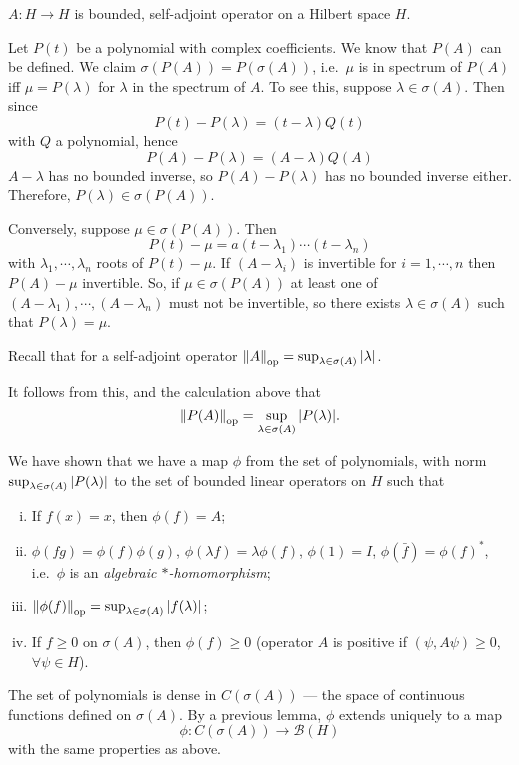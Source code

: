 \documentclass[a4paper,11pt]{article}
\begin{document}
	$A : H \to H$ is bounded, self-adjoint operator on a Hilbert space $H$.

	Let $P(t)$ be a polynomial with complex coefficients. We know that $P(A)$ can be defined. We claim $\sigma(P(A)) = P(\sigma(A))$, i.e.\ $\mu$ is in spectrum of $P(A)$ iff $\mu = P(\lambda)$ for $\lambda$ in the spectrum of $A$. To see this, suppose $\lambda \in \sigma(A)$. Then since 
	\[
		P(t) - P(\lambda) = (t - \lambda) Q(t)
	\]
	with $Q$ a polynomial, hence 
	\[
		P(A) - P(\lambda) = (A - \lambda) Q(A)
	\]
	$A - \lambda$ has no bounded inverse, so $P(A) - P(\lambda)$ has no bounded inverse either. Therefore, $P(\lambda) \in \sigma(P(A))$.
	
	Conversely, suppose $\mu \in \sigma(P(A))$. Then 
	\[
		P(t) - \mu = a(t - \lambda_1) \cdots (t - \lambda_n)
	\]
	with $\lambda_1, \cdots, \lambda_n$ roots of $P(t) - \mu$. If $(A - \lambda_i)$ is invertible for $i = 1,\cdots, n$ then $P(A) - \mu$ invertible. So, if $\mu \in \sigma(P(A))$ at least one of $(A - \lambda_1), \cdots, (A - \lambda_n)$ must not be invertible, so there exists $\lambda \in \sigma(A)$ such that $P(\lambda) = \mu$.

	Recall that for a self-adjoint operator $\norm{A}_{\mathrm{op}} = \sup _{\lambda \in \sigma(A)} \abs{\lambda}$. 

	It follows from this, and the calculation above that
	\[
		\norm{P(A)}_{\mathrm{op}} = \sup _{\lambda \in \sigma(A)} \abs{P(\lambda)}.
	\]
	
	We have shown that we have a map $\phi$ from the set of polynomials, with norm $\sup _{\lambda \in \sigma(A)} \abs{P(\lambda)}$ to the set of bounded linear operators on $H$ such that 
	\begin{enumerate}[i)]
		\item If $f(x) = x$, then $\phi(f) = A$;
		\item $\phi(fg) = \phi(f) \phi(g)$, $\phi(\lambda f) = \lambda \phi(f)$, $\phi(1) = I$, $\phi(\bar f) = \phi(f)^*$, i.e.\ $\phi$ is an \emph{algebraic $*$-homomorphism};
		\item $\norm{\phi(f)}_{\mathrm{op}} = \sup _{\lambda \in \sigma(A)} \abs{f(\lambda)}$;
		\item If $f \geq 0$ on $\sigma(A)$, then $\phi(f) \geq 0$ (operator $A$ is positive if $(\psi, A \psi) \geq 0$, $\forall \psi \in H$).  
	\end{enumerate}

	The set of polynomials is dense in $C(\sigma(A))$ --- the space of continuous functions defined on $\sigma(A)$. By a previous lemma, $\phi$ extends uniquely to a map 
	\[
		\phi : C(\sigma(A)) \to \mathcal{B}(H)
	\]
	with the same properties as above.
\end{document}
